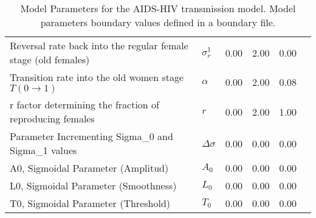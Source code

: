\begin{table}
\begin{tabular}{p{5cm}lcccc}
Reversal rate back into the regular female stage (old females) & $\sigma^1_r$ & 0.00 & 2.00 & 0.00\\
Transition rate into the old women stage $T(0\rightarrow 1)$ & $\alpha$ & 0.00 & 2.00 & 0.08\\
r factor determining the fraction of reproducing females & $r$ & 0.00 & 2.00 & 1.00\\
Parameter Incrementing Sigma_0 and Sigma_1 values  & $\Delta\sigma$ & 0.00 & 0.00 & 0.00\\
A0, Sigmoidal Parameter (Amplitud) & $A_0$ & 0.00 & 0.00 & 0.00\\
L0, Sigmoidal Parameter (Smoothness) & $L_0$ & 0.00 & 0.00 & 0.00\\
T0, Sigmoidal Parameter (Threshold) & $T_0$ & 0.00 & 0.00 & 0.00\\
\hline\hline
\end{tabular}
\caption{Model Parameters for the AIDS-HIV transmission model. Model parameters boundary values defined in a boundary file.}
\end{table}
